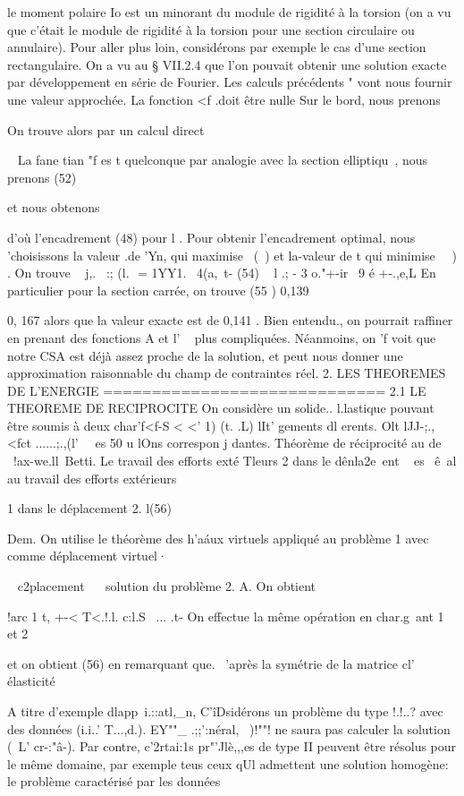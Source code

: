{{{{{{{{le moment polaire Io est un minorant du module de rigidité à la torsion (on a vu que c'était le module de rigidité à la torsion pour une section circulaire ou annulaire). 
Pour aller plus loin, considérons par exemple le cas d'une sec­tion rectangulaire. On a vu au § VII.2.4 que l'on pouvait obtenir une so­lution exacte par développement en série de Fourier. Les calculs précédents 
"­
vont nous fournir une valeur approchée. La fonction <f .doit être nulle Sur le bord, nous prenons 

On trouve alors par un calcul direct 

~ 
La fane tian "f es t quelconque par analogie avec la section elliptiqu~, nous prenons 
(52) 

et nous obtenons 

d'où l'encadrement (48) pour l . Pour obtenir l'encadrement optimal, nous 'choisissons la valeur .de 'Yn, qui maximise ~(~) et la-valeur de t qui mi­nimise ~~) . On trouve 
~ j,.~
:; (l. ­
=
1YY1.~ 
4(a,~t-%
(54) ~ l .;
-
3 o."+-ir~ 9 é +-.,e,L 
En particulier pour la section carrée, on trouve 
(55 ) 0,139 

0, 167 
alors que la valeur exacte est de 0,141 . Bien entendu., on pourrait raffi­ner en prenant des fonctions A et l' ~ plus compliquées. Néanmoins, on
'f 
voit que notre CSA est déjà assez proche de la solution, et peut nous donner une approximation raisonnable du champ de contraintes réel. 
2. LES THEOREMES DE L'ENERGIE 
============================= 
2.1 LE THEOREME DE RECIPROCITE 
On considère un solide.. l.lastique pouvant être soumis à deux char­'f<f-S < <' 1) (t. .L) lIt'
gements dl erents. Olt lJJ-;.,<fct ......;.,(l'~~ es 50 u lOns correspon­
j
dantes. 
Théorème de réciprocité au de ~!ax-we.ll~Betti. Le travail des efforts exté­
Tleurs 2 dans le dênla2e~ent ~ es~ ê~al au travail des efforts extérieurs 

1 dans le déplacement 2. 
l(56) 


Dem. On utilise le théorème des h'a\'aux virtuels appliqué au problème 1 avec comme déplacement virtuel·}~ c2placement ~~ solution du problème 2. 
A. 
On obtient 

!arc 1 t,
+-< T<.!.l. c:l.S
\ ... .t-
On effectue la même opération en char.g~ant 1 et 2 

et on obtient (56) en remarquant que. ~'après la symétrie de la matrice cl' élasticité 

A titre d'exemple dlapp~i.::atl,_n, C'îDsidérons un problème du type !.!..? avec des données (i.i..' T...,d.). EY""_ .;;':néral, ~)!""! ne saura pas calculer la so­lution (~L' cr-:"â-). Par contre, c'2rtai:1s pr"'Jlè,,,es de type II peuvent être résolus pour le même domaine, par exemple teus ceux qUl admettent une solu­tion homogène: le problème caractérisé par les données 

}}}}}}}
